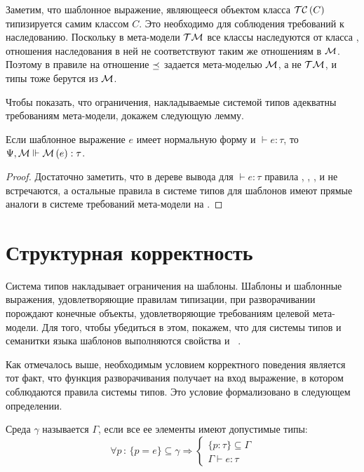 {Заметим, что шаблонное выражение, являющееся объектом класса $\mathcal{TC}\left(C\right)$ типизируется самим классом $C$. Это необходимо для соблюдения требований к наследованию. Поскольку в мета-модели $\mathcal{TM}$ все классы наследуются от класса , отношения наследования в ней не соответствуют таким же отношениям в $\mathcal{M}$. Поэтому в правиле  на  отношение $\preceq$ задается мета-моделью $\mathcal{M}$, а не $\mathcal{TM}$, и типы тоже берутся из $\mathcal{M}$. 

Чтобы показать, что ограничения, накладываемые системой типов адекватны требованиям мета-модели, докажем следующую лемму.
\begin{Lemm}\label{LemmNF}
Если шаблонное выражение $e$ имеет нормальную форму и $\vdash e : \tau$, то $\Psi, \mathcal{M} \Vdash \mathcal{M}\left(e\right) : \tau$.
\end{Lemm}
\begin{proof}
Достаточно заметить, что в дереве вывода для $\vdash e : \tau$ правила , , ,  и  не встречаются, а остальные правила в системе типов для шаблонов имеют прямые аналоги в системе требований мета-модели на .
\end{proof}

\section{Структурная корректность}

Система типов накладывает ограничения на шаблоны. Шаблоны и шаблонные выражения, удовлетворяющие правилам типизации, при разворачивании порождают конечные объекты, удовлетворяющие требованиям целевой мета-модели.
Для того, чтобы убедиться в этом, покажем, что для системы типов и семанитки языка шаблонов выполняются свойства  и ~\cite{Pierce}. 

Как отмечалось выше, необходимым условием корректного поведения является тот факт, что функция разворачивания получает на вход выражение, в котором соблюдаются правила системы типов. Это условие формализовано в следующем определении.

\begin{Def}\label{agree}
Среда $\gamma$ называется  $\Gamma$, если все ее элементы имеют допустимые типы:
$$
	\forall p \, : \, 
		\{p = e\} \subseteq \gamma 
			\Rightarrow 
		\left\{\begin{array}{l}		
		\{p : \tau\} \subseteq \Gamma \\
		\Gamma \vdash e : \tau
		\end{array}\right.
$$
\end{Def}

}
